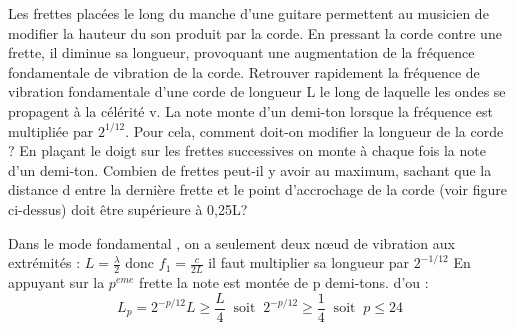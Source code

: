 \begin{Exercise}[title=Guitare]
	Les frettes placées le long du manche d’une guitare permettent au musicien de modifier la hauteur du son produit par la corde. En pressant la corde contre une frette, il diminue sa longueur, provoquant une augmentation de la fréquence fondamentale de vibration de la corde.
	\Question Retrouver rapidement la fréquence de vibration fondamentale d’une corde de longueur L le long de laquelle les ondes se propagent à la célérité v.
	\Question La note monte d’un demi-ton lorsque la fréquence est multipliée par $2^{1/12}$. Pour cela, comment doit-on modifier la longueur de la corde ?
	\Question En plaçant le doigt sur les frettes successives on monte à chaque fois la note d’un demi-ton. Combien de frettes peut-il y avoir au maximum, sachant que la distance d entre la dernière frette et le point d’accrochage de la corde (voir figure ci-dessus) doit être supérieure à 0,25L?
\end{Exercise}
\begin{Answer}
	\Question Dans le mode fondamental , on a seulement deux nœud de vibration aux extrémités : $L=\frac{\lambda}{2}$ donc $f_1=\frac{c}{2L}$
	\Question il faut multiplier sa longueur par $2^{-1/12}$
	\Question En appuyant sur la $p^{eme}$ frette la note est montée de p demi-tons. d'ou :
	\[ L_p=2^{-p/12}L \geq \frac{L}{4} ~\text{ soit }~ 2^{-p/12} \geq \frac{1}{4} ~\text{ soit }~ p\leq 24\]
\end{Answer}
